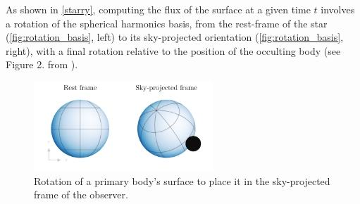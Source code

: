 \documentclass[modern]{aastex631}
\begin{document}
As shown in \autoref{starry}, computing the flux of the surface at a given time $t$ involves a rotation of the spherical harmonics basis, from the rest-frame of the star (\autoref{fig:rotation_basis}, left) to its sky-projected orientation (\autoref{fig:rotation_basis}, right), with a final rotation relative to the position of the occulting body (see Figure 2. from \citealt{starry}).
\begin{figure}[H]
    \begin{center}
        \includegraphics[width=0.6\textwidth]{../workflows/geometry/figures/rotation_basis.pdf}
        \caption{Rotation of a primary body's surface to place it in the sky-projected frame of the observer. }
        \label{fig:rotation_basis}
    \end{center}
\end{figure}
\end{document}

